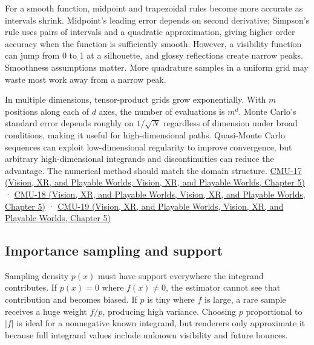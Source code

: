 For a smooth function, midpoint and trapezoidal rules become more accurate as intervals shrink. Midpoint's leading error depends on second derivative; Simpson's rule uses pairs of intervals and a quadratic approximation, giving higher order accuracy when the function is sufficiently smooth. However, a visibility function can jump from 0 to 1 at a silhouette, and glossy reflections create narrow peaks. Smoothness assumptions matter. More quadrature samples in a uniform grid may waste most work away from a narrow peak.

In multiple dimensions, tensor-product grids grow exponentially. With \(m\) positions along each of \(d\) axes, the number of evaluations is \(m^d\). Monte Carlo's standard error depends roughly on \(1/\sqrt{N}\) regardless of dimension under broad conditions, making it useful for high-dimensional paths. Quasi-Monte Carlo sequences can exploit low-dimensional regularity to improve convergence, but arbitrary high-dimensional integrands and discontinuities can reduce the advantage. The numerical method should match the domain structure. \href{../07-Vision-XR-and-Playable-Worlds/main.pdf\#nameddest=04-visual-computing-ii-ch036-cmu-17---numerical-integration}{CMU-17 (Vision, XR, and Playable Worlds, Vision, XR, and Playable Worlds, Chapter 5)} · \href{../07-Vision-XR-and-Playable-Worlds/main.pdf\#nameddest=04-visual-computing-ii-ch036-cmu-18---monte-carlo-rendering}{CMU-18 (Vision, XR, and Playable Worlds, Vision, XR, and Playable Worlds, Chapter 5)} · \href{../07-Vision-XR-and-Playable-Worlds/main.pdf\#nameddest=04-visual-computing-ii-ch036-cmu-19---variance-reduction}{CMU-19 (Vision, XR, and Playable Worlds, Vision, XR, and Playable Worlds, Chapter 5)}

\subsection{Importance sampling and support}\label{03-visual-computing-i-ch012-importance-sampling-and-support}

Sampling density \(p(x)\) must have support everywhere the integrand contributes. If \(p(x)=0\) where \(f(x)\ne0\), the estimator cannot see that contribution and becomes biased. If \(p\) is tiny where \(f\) is large, a rare sample receives a huge weight \(f/p\), producing high variance. Choosing \(p\) proportional to \(|f|\) is ideal for a nonnegative known integrand, but renderers only approximate it because full integrand values include unknown visibility and future bounces.

